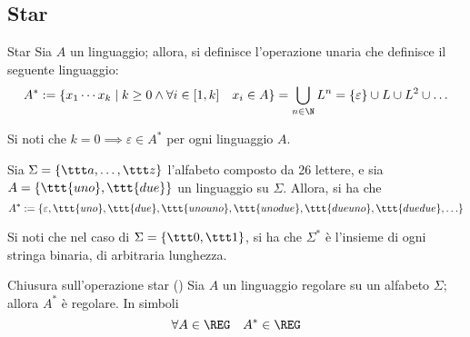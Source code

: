 \documentclass[a4paper, 12pt]{report}
\begin{document}
    \subsection{Star}

    \begin{frameddefn}{Star}
        Sia $A$ un linguaggio; allora, si definisce l'operazione unaria  che definisce il seguente linguaggio: $$A^* := \{x_1 \cdots x_k \mid k \ge 0 \land \forall i \in [1, k] \quad x_i \in A\} = \displaystyle \bigcup_{n \in \N}{L^n}=\{ \varepsilon \} \cup L \cup L^2 \cup \ldots$$

        Si noti che $k = 0 \implies \varepsilon \in A^*$ per ogni linguaggio $A$.
    \end{frameddefn}

    \begin{example}[Star]
        Sia $\Sigma = \{\ttt a , \ldots, \ttt z\}$ l'alfabeto composto da 26 lettere, e sia $A = \{\ttt{uno}, \ttt{due}\}$ un linguaggio su $\Sigma$. Allora, si ha che $$A^* := \{\varepsilon, \ttt{uno}, \ttt{due}, \ttt{unouno}, \ttt{unodue}, \ttt{dueuno}, \ttt{duedue}, \ldots\}$$
    \end{example}
   
    \begin{example}
        Si noti che nel caso di $\Sigma = \{ \ttt 0, \ttt 1 \}$, si ha che $\Sigma^*$ è l'insieme di ogni stringa binaria, di arbitraria lunghezza.
    \end{example}

    \begin{framedprop}[label={closure star}]{Chiusura sull'operazione star (\REG)}
        Sia $A$ un linguaggio regolare su un alfabeto $\Sigma$; allora $A^*$ è regolare. In simboli $$\forall A \in \REG \quad A^* \in \REG$$
    \end{framedprop}
\end{document}
